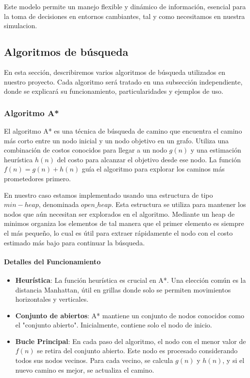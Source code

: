 \documentclass[11pt]{article}
\begin{document}
Este modelo permite un manejo flexible y dinámico de información, esencial para la toma de decisiones en entornos cambiantes, tal y como necesitamos en nuestra simulacion.
\subsection{Algoritmos de búsqueda}
En esta sección, describiremos varios algoritmos de búsqueda utilizados en nuestro proyecto. Cada algoritmo será tratado en una subsección independiente, donde se explicará su funcionamiento, particularidades y ejemplos de uso.

\subsubsection{Algoritmo A*}
El algoritmo A* es una técnica de búsqueda de camino que encuentra el camino más corto entre un nodo inicial y un nodo objetivo en un grafo. Utiliza una combinación de costos conocidos para llegar a un nodo \( g(n) \) y una estimación heurística \( h(n) \) del costo para alcanzar el objetivo desde ese nodo. La función \( f(n) = g(n) + h(n) \) guía el algoritmo para explorar los caminos más prometedores primero.

En nuestro caso estamos implementado usando una estructura de tipo $min-heap$, denominada $open\_heap$. Esta estructura se utiliza para mantener los nodos que aún necesitan ser explorados en el algoritmo. Mediante un heap de minimos organiza los elementos de tal manera que el primer elemento es siempre el más pequeño, lo cual es útil para extraer rápidamente el nodo con el costo estimado más bajo para continuar la búsqueda.


\paragraph{Detalles del Funcionamiento}
\begin{itemize}
    \item \textbf{Heurística}: La función heurística es crucial en A*. Una elección común es la distancia Manhattan, útil en grillas donde solo se permiten movimientos horizontales y verticales.
    \item \textbf{Conjunto de abiertos}: A* mantiene un conjunto de nodos conocidos como el "conjunto abierto". Inicialmente, contiene solo el nodo de inicio.
    \item \textbf{Bucle Principal}: En cada paso del algoritmo, el nodo con el menor valor de \( f(n) \) se retira del conjunto abierto. Este nodo es procesado considerando todos sus nodos vecinos. Para cada vecino, se calcula \( g(n) \) y \( h(n) \), y si el nuevo camino es mejor, se actualiza el camino.
\end{itemize}
\end{document}
